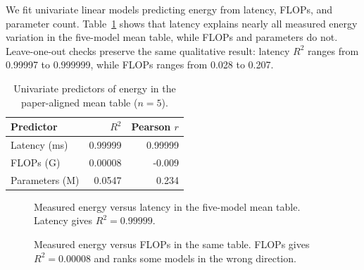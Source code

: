 \documentclass[conference]{IEEEtran}
\begin{document}
We fit univariate linear models predicting energy from latency, FLOPs, and
parameter count. Table~\ref{tab:predictors} shows that latency explains nearly
all measured energy variation in the five-model mean table, while FLOPs and
parameters do not. Leave-one-out checks preserve the same qualitative result:
latency $R^2$ ranges from 0.99997 to 0.999999, while FLOPs ranges from 0.028
to 0.207.

\begin{table}[t]
\centering
\caption{Univariate predictors of energy in the paper-aligned mean table
($n=5$).}
\label{tab:predictors}
\small
\begin{tabular}{lrr}
\toprule
Predictor & $R^2$ & Pearson $r$\\
\midrule
Latency (ms) & 0.99999 & 0.99999\\
FLOPs (G) & 0.00008 & -0.009\\
Parameters (M) & 0.0547 & 0.234\\
\bottomrule
\end{tabular}
\end{table}

\begin{figure}[t]
\centering
{}
\caption{Measured energy versus latency in the five-model mean table.
Latency gives $R^2=0.99999$.}
\label{fig:energy-latency}
\end{figure}

\begin{figure}[t]
\centering
{}
\caption{Measured energy versus FLOPs in the same table. FLOPs gives
$R^2=0.00008$ and ranks some models in the wrong direction.}
\label{fig:energy-flops}
\end{figure}
\end{document}
